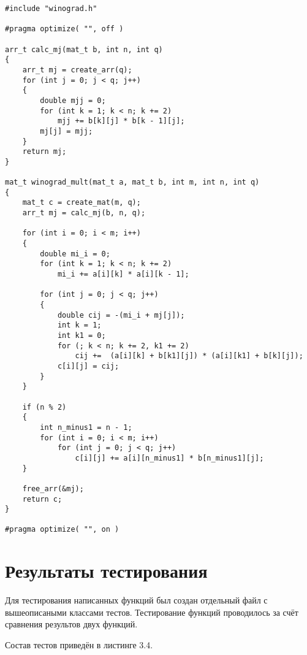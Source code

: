\begin{lstlisting}[caption = Оптимизированая функция умножения матриц алгоритмом Винограда.]
#include "winograd.h"

#pragma optimize( "", off )

arr_t calc_mj(mat_t b, int n, int q)
{
	arr_t mj = create_arr(q);
	for (int j = 0; j < q; j++)
	{
		double mjj = 0; 
		for (int k = 1; k < n; k += 2)
			mjj += b[k][j] * b[k - 1][j];
		mj[j] = mjj;
	}
	return mj;
}

mat_t winograd_mult(mat_t a, mat_t b, int m, int n, int q)
{
	mat_t c = create_mat(m, q);
	arr_t mj = calc_mj(b, n, q);
	
	for (int i = 0; i < m; i++)
	{
		double mi_i = 0;
		for (int k = 1; k < n; k += 2)
			mi_i += a[i][k] * a[i][k - 1];
		
		for (int j = 0; j < q; j++)
		{
			double cij = -(mi_i + mj[j]);
			int k = 1;
			int k1 = 0;
			for (; k < n; k += 2, k1 += 2)
				cij +=	(a[i][k] + b[k1][j]) * (a[i][k1] + b[k][j]);
			c[i][j] = cij;
		}
	}
	
	if (n % 2)
	{
		int n_minus1 = n - 1;
		for (int i = 0; i < m; i++)
			for (int j = 0; j < q; j++)
				c[i][j] += a[i][n_minus1] * b[n_minus1][j];
	}
	
	free_arr(&mj);
	return c;
}

#pragma optimize( "", on )
\end{lstlisting}



\section{Результаты тестирования}
Для тестирования написанных функций был создан отдельный файл с вышеописаными классами тестов. Тестирование функций проводилось за счёт сравнения результов двух функций.

Состав тестов приведён в листинге 3.4.

